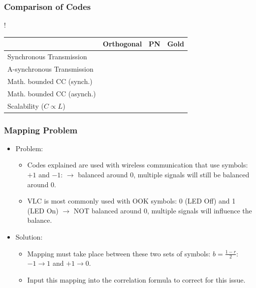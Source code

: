 \documentclass{beamer}
\newcommand{\cmark}{\ding{51}}%
\newcommand{\xmark}{\ding{55}}%
\begin{document}
	\begin{frame}\frametitle{Comparison of Codes}
		

		\begin{table}
			\centering
			\resizebox {\textwidth} {!} {
				\begin{tabular}{ | l | l | l | l | }

					\hline
																	& Orthogonal 	& PN 		& Gold 		\\ \hline
					Synchronous	Transmission						& \cmark		& \cmark	& \cmark	\\ \hline
					A-synchronous Transmission						& \xmark		& \cmark	& \cmark	\\ \hline
					Math. bounded CC (synch.)						& \cmark		& \xmark	& \cmark	\\ \hline
					Math. bounded CC (asynch.)						& \xmark		& \xmark	& \cmark	\\ \hline
					Scalability ($C \propto L$)						& \cmark		& \xmark	& \cmark	\\ \hline		


				\end{tabular}
			}

		\end{table}
	\end{frame}





	\begin{frame}\frametitle{Mapping Problem}

		\begin{itemize}

			\item Problem:

			\begin{itemize}

				\item Codes explained are used with wireless communication that use symbols: $+1$ and $-1$: $\rightarrow$ balanced around $0$, multiple signals will still be balanced around $0$.

				\item VLC is most commonly used with OOK symbols: 0 (LED Off) and 1 (LED On) $\rightarrow$ NOT balanced around $0$, multiple signals will influence the balance.

				
			\end{itemize}

			\item Solution:
			\begin{itemize}

				\item Mapping must take place between these two sets of symbols: $b = \frac{1 - r}{2}$: $-1 \rightarrow 1$ and $+1 \rightarrow 0$.

				\item Input this mapping into the correlation formula to correct for this issue.

			\end{itemize}

		\end{itemize}
	\end{frame}
\end{document}
